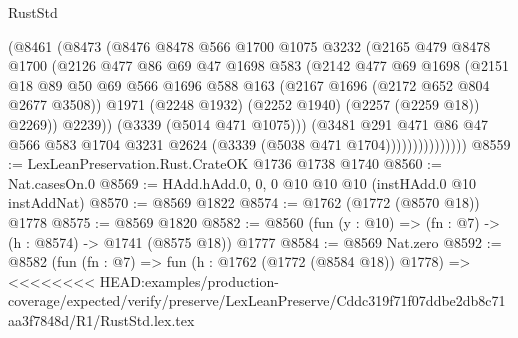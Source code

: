 \begin{lexlean}{RustStd}
\begin{coremodule}
{\begin{coremodule}
{{{{{{{{{{{{{{{                        (@8461
                          (@8473
                            (@8476
                              @8478
                              @566
                              @1700
                              @1075
                              @3232
                              (@2165
                                @479
                                @8478
                                @1700
                                (@2126
                                  @477
                                  @86
                                  @69
                                  @47
                                  @1698
                                  @583
                                  (@2142
                                    @477
                                    @69
                                    @1698
                                    (@2151
                                      @18
                                      @89
                                      @50
                                      @69
                                      @566
                                      @1696
                                      @588
                                      @163
                                      (@2167 @1696 (@2172 @652 @804 @2677 @3508))
                                      @1971
                                      (@2248 @1932)
                                      (@2252 @1940)
                                      (@2257 (@2259 @18))
                                      @2269))
                                  @2239))
                              (@3339 (@5014 @471 @1075)))
                            (@3481
                              @291
                              @471
                              @86
                              @47
                              @566
                              @583
                              @1704
                              @3231
                              @2624
                              (@3339 (@5038 @471 @1704)))))))))))))))
@8559 := LexLeanPreservation.Rust.CrateOK @1736 @1738 @1740
@8560 := Nat.casesOn.{0}
@8569 := HAdd.hAdd.{0, 0, 0} @10 @10 @10 (instHAdd.{0} @10 instAddNat)
@8570 := @8569 @1822
@8574 := @1762 (@1772 (@8570 @18)) @1778
@8575 := @8569 @1820
@8582 := @8560 (fun (y : @10) => (fn : @7) -> (h : @8574) -> @1741 (@8575 @18)) @1777
@8584 := @8569 Nat.zero
@8592 := @8582
    (fun (fn : @7) =>
    fun (h : @1762 (@1772 (@8584 @18)) @1778) =>
<<<<<<<< HEAD:examples/production-coverage/expected/verify/preserve/LexLeanPreserve/Cddc319f71f07ddbe2db8c71aa3f7848d/R1/RustStd.lex.tex
}}}}}}}}}}}}}}}
\end{coremodule}}
\end{coremodule}
\end{lexlean}
